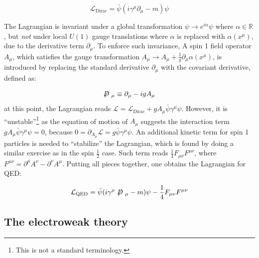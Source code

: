 \begin{equation}
    \mathcal{L}_\text{Dirac} = \bar{\psi} (i\gamma^\mu\partial_\mu - m) \psi
\end{equation}

The Lagrangian is invariant under a global transformation
$\psi \rightarrow e^{i\alpha} \psi$ where $\alpha \in \mathbb{R}$,
but \emph{not} under local $U(1)$ gauge translations where $\alpha$ is replaced
with $\alpha(x^\mu)$,
due to the derivative term $\partial_\mu$.
To enforce such invariance,
A spin 1 field operator $A_\mu$,
which satisfies the gauge transformation
$A_\mu \rightarrow A_\mu + \frac{1}{g} \partial_\mu \alpha(x^\mu)$,
is introduced by replacing the standard derivative $\partial_\mu$ with the
covariant derivative, defined as:

\begin{equation}
    \fsl{D}_\mu \equiv \partial_\mu - i g A_\mu
\end{equation}
at this point, the Lagrangian reads
$\mathcal{L} = \mathcal{L}_\text{Dirac} + g A_\mu\bar{\psi}\gamma^\mu\psi$.
However, it is ``unstable''\footnote{
    This is not a standard terminology.
} as the equation of motion of $A_\mu$
suggests the interaction term $g A_\mu\bar{\psi}\gamma^\mu\psi = 0$,
because $0 = \partial_{A_\mu} \mathcal{L} = g \bar{\psi}\gamma^\mu\psi$.
An additional kinetic term for spin 1 particles is needed to ``stabilize'' the
Lagrangian,
which is found by doing a similar exercise as in the spin $\frac{1}{2}$ case.
Such term reads $\frac{1}{4}F_{\mu\nu}F^{\mu\nu}$,
where $F^{\mu\nu} = \partial^\mu A^\nu - \partial^\nu A^\mu$.
Putting all pieces together, one obtains the Lagrangian for QED:

\begin{equation}
    \mathcal{L}_\text{QED} = \bar{\psi} (i\gamma^\mu\fsl{D}_\mu - m) \psi - \frac{1}{4}F_{\mu\nu}F^{\mu\nu}
\end{equation}


\subsection{The electroweak theory}
\label{ew-th}

